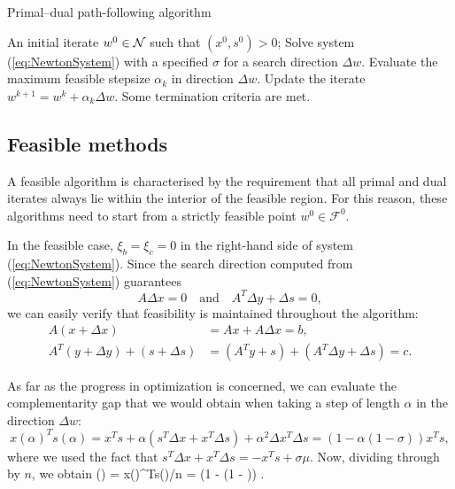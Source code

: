\begin{algorithm}[ht]
  \caption{Primal--dual path-following algorithm}
    \begin{algorithmic}[0]  \label{alg:PrimalDual}
      \REQUIRE An initial iterate $w^0 \in \mathcal{N}$ such that $(x^0, s^0) > 0$;
      \smallskip
      \REPEAT
        \STATE Solve system (\ref{eq:NewtonSystem}) with a specified $\sigma$
	       for a search direction $\Delta w$.
        \smallskip
        \STATE Evaluate the maximum feasible stepsize $\alpha_k$ in 
	       direction $\Delta w$.
        \smallskip
        \STATE Update the iterate $w^{k+1} = w^k + \alpha_k\Delta w$.
        \smallskip
      \UNTIL Some termination criteria are met.
    \end{algorithmic}
\end{algorithm}

%
%
\subsection{Feasible methods}
\label{sec:FeasibleMethods}

A feasible algorithm is characterised by the requirement that
all primal and dual iterates always lie within the interior 
of the feasible region. For this reason, these algorithms 
need to start from a strictly feasible point $w^0 \in\mathcal{F}^0$.

In the feasible case, $\xi_b = \xi_c = 0$
in the right-hand side of system (\ref{eq:NewtonSystem}). 
Since
the search direction computed from (\ref{eq:NewtonSystem})
guarantees
\[
  A \Delta x = 0 \quad \text{and} \quad
  A^T \Delta y + \Delta s = 0,
\]
we can easily verify that feasibility is maintained 
throughout the algorithm: 
\[
  \begin{split}
  A (x + \Delta x) &= Ax + A\Delta x = b, \\
  A^T(y +\Delta y) + (s +\Delta s) &= (A^T y +s) + (A^T\Delta y +\Delta s) = c.
  \end{split}
\]

As far as the progress in optimization is concerned,
we can evaluate the complementarity gap that we would
obtain when taking a step of length $\alpha$ in the direction $\Delta w$:
\[
   x(\alpha)^Ts(\alpha) = x^Ts + \alpha(s^T \Delta x + x^T \Delta s)
     + \alpha^2 \Delta x^T \Delta s = (1 - \alpha (1 - \sigma)) x^Ts,
\]
where we used the fact that
$s^T \Delta x + x^T \Delta s = -x^Ts + \sigma\mu$.
Now, dividing through by $n$, we obtain
\be  \label{eq:OptimalityProgress}
   \mu(\alpha) = x(\alpha)^Ts(\alpha)/n = (1 - \alpha (1 - \sigma)) \mu.
\ee

